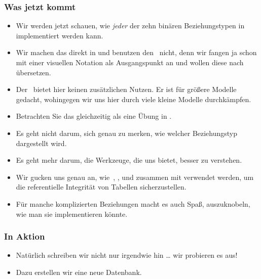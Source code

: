 \documentclass[aspectratio=169,mathserif,notheorems]{beamer}%
\begin{document}
\begin{frame}%
\frametitle{Was jetzt kommt}%
\begin{itemize}%
\item Wir werden jetzt schauen, wie \emph{jeder} der zehn binären Beziehungstypen in  implementiert werden kann.%
%
\item<2-> Wir machen das direkt in  und benutzen den \pgmodeler\ nicht, denn wir fangen ja schon mit einer visuellen Notation als Ausgangspunkt an und wollen diese nach  übersetzen.%
%
\item<3-> Der \pgmodeler\ bietet hier keinen zusätzlichen Nutzen. Er ist für größere Modelle gedacht, wohingegen wir uns hier durch viele kleine Modelle durchkämpfen.%
%
\item<4-> Betrachten Sie das gleichzeitig als eine Übung in .%
%
\item<5-> Es geht nicht darum, sich genau zu merken, wie welcher Beziehungstyp dargestellt wird.%
%
\item<6-> Es geht mehr darum, die Werkzeuge, die  uns bietet, besser zu verstehen.%
%
\item<7-> Wir gucken uns genau an, wie~, ,  und \cite{PGDG:PD:C} zusammen mit \cite{PGDG:PD:JT} verwendet werden, um die referentielle Integrität von Tabellen sicherzustellen.%
%
\item<8-> Für manche komplizierten Beziehungen macht es auch Spaß, auszuknobeln, wie man sie implementieren könnte.%
\end{itemize}%
\end{frame}%
%
%
\begin{frame}[t]%
\frametitle{In Aktion}%
\begin{itemize}%
\item Natürlich schreiben wir nicht nur  irgendwie hin {\dots} wir probieren es aus!%
%
\item<2-> Dazu erstellen wir eine neue Datenbank.%
\end{itemize}%
%
\end{frame}%
%
%
%
%
%
%
%
%
%
%
%
%
\end{document}

